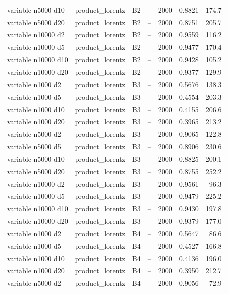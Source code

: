 \begin{longtable}{llllrrr}
variable n5000 d10 & product\_lorentz & B2 & -- & 2000 & 0.8821 & 174.7 \\
variable n5000 d20 & product\_lorentz & B2 & -- & 2000 & 0.8751 & 205.7 \\
variable n10000 d2 & product\_lorentz & B2 & -- & 2000 & 0.9559 & 116.2 \\
variable n10000 d5 & product\_lorentz & B2 & -- & 2000 & 0.9477 & 170.4 \\
variable n10000 d10 & product\_lorentz & B2 & -- & 2000 & 0.9428 & 105.2 \\
variable n10000 d20 & product\_lorentz & B2 & -- & 2000 & 0.9377 & 129.9 \\
variable n1000 d2 & product\_lorentz & B3 & -- & 2000 & 0.5676 & 138.3 \\
variable n1000 d5 & product\_lorentz & B3 & -- & 2000 & 0.4554 & 203.3 \\
variable n1000 d10 & product\_lorentz & B3 & -- & 2000 & 0.4155 & 206.6 \\
variable n1000 d20 & product\_lorentz & B3 & -- & 2000 & 0.3965 & 213.2 \\
variable n5000 d2 & product\_lorentz & B3 & -- & 2000 & 0.9065 & 122.8 \\
variable n5000 d5 & product\_lorentz & B3 & -- & 2000 & 0.8906 & 230.6 \\
variable n5000 d10 & product\_lorentz & B3 & -- & 2000 & 0.8825 & 200.1 \\
variable n5000 d20 & product\_lorentz & B3 & -- & 2000 & 0.8755 & 252.2 \\
variable n10000 d2 & product\_lorentz & B3 & -- & 2000 & 0.9561 & 96.3 \\
variable n10000 d5 & product\_lorentz & B3 & -- & 2000 & 0.9479 & 225.2 \\
variable n10000 d10 & product\_lorentz & B3 & -- & 2000 & 0.9430 & 197.8 \\
variable n10000 d20 & product\_lorentz & B3 & -- & 2000 & 0.9379 & 177.0 \\
variable n1000 d2 & product\_lorentz & B4 & -- & 2000 & 0.5647 & 86.6 \\
variable n1000 d5 & product\_lorentz & B4 & -- & 2000 & 0.4527 & 166.8 \\
variable n1000 d10 & product\_lorentz & B4 & -- & 2000 & 0.4136 & 196.0 \\
variable n1000 d20 & product\_lorentz & B4 & -- & 2000 & 0.3950 & 212.7 \\
variable n5000 d2 & product\_lorentz & B4 & -- & 2000 & 0.9056 & 72.9 \\

\end{longtable}
